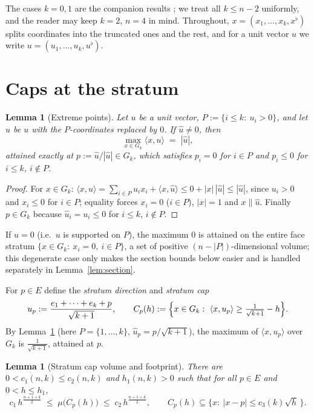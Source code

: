 ﻿\documentclass[11pt]{article}
\newtheorem{lemma}[theorem]{Lemma}
\begin{document}
The cases $k=0,1$ are the companion results
\cite{companion4,companion6,companion7}; we treat all $k\le n-2$ uniformly,
and the reader may keep $k=2$, $n=4$ in mind.  Throughout,
$x=(x_1,\dots,x_k,x^\flat)$ splits coordinates into the truncated ones and the
rest, and for a unit vector $u$ we write $u=(u_1,\dots,u_k,u^\flat)$.

\section{Caps at the stratum}\label{sec:caps}

\begin{lemma}[Extreme points]\label{lem:extreme}
Let $u$ be a unit vector, $P:=\{i\le k:\ u_i>0\}$, and let
$\hat u$ be $u$ with the $P$-coordinates replaced by $0$.  If
$\hat u\ne0$, then
\[
\max_{x\in G_k}\langle x,u\rangle\;=\;|\hat u|,
\]
attained exactly at $p:=\hat u/|\hat u|\in G_k$, which satisfies $p_i=0$ for
$i\in P$ and $p_i\le0$ for $i\le k$, $i\notin P$.
\end{lemma}

\begin{proof}
For $x\in G_k$: $\langle x,u\rangle=\sum_{i\in P}u_ix_i
+\langle x,\hat u\rangle\le0+|x|\,|\hat u|\le|\hat u|$, since $u_i>0$ and
$x_i\le0$ for $i\in P$; equality forces $x_i=0$ ($i\in P$), $|x|=1$ and
$x\parallel\hat u$.  Finally $p\in G_k$ because $\hat u_i=u_i\le0$ for
$i\le k$, $i\notin P$.
\end{proof}

If $\hat u=0$ (i.e.\ $u$ is supported on $P$), the maximum $0$ is attained on
the entire face stratum $\{x\in G_k:\ x_i=0,\ i\in P\}$, a set of positive
$(n-|P|)$-dimensional volume; this degenerate case only makes the section
bounds below easier and is handled separately in Lemma~\ref{lem:section}.

For $p\in E$ define the \emph{stratum direction} and \emph{stratum cap}
\[
u_p:=\frac{e_1+\dots+e_k+p}{\sqrt{k+1}},
\qquad
C_p(h):=\Bigl\{x\in G_k:\ \langle x,u_p\rangle\ge\tfrac1{\sqrt{k+1}}-h\Bigr\}.
\]
By Lemma~\ref{lem:extreme} (here $P=\{1,\dots,k\}$, $\hat u_p=p/\sqrt{k+1}$),
the maximum of $\langle x,u_p\rangle$ over $G_k$ is $\frac1{\sqrt{k+1}}$,
attained at $p$.

\begin{lemma}[Stratum cap volume and footprint]\label{lem:capmass}
There are $0<c_1(n,k)\le c_2(n,k)$ and $h_1(n,k)>0$ such that for all
$p\in E$ and $0<h\le h_1$,
\[
c_1\,h^{\frac{n+1+k}2}\;\le\;\mu\bigl(C_p(h)\bigr)\;\le\;
c_2\,h^{\frac{n+1+k}2},
\qquad
C_p(h)\subseteq\{x:\ |x-p|\le c_3(k)\sqrt h\,\}.
\]
\end{lemma}
\end{document}
